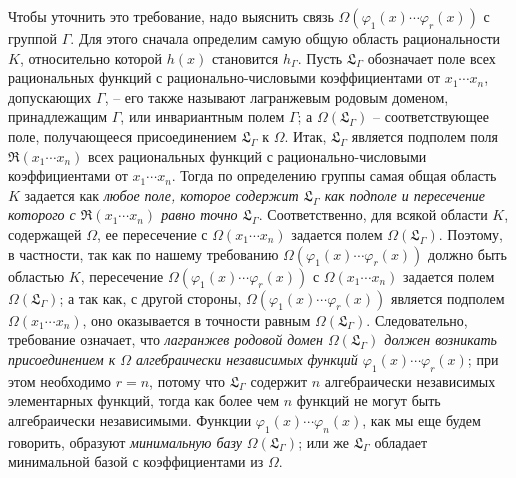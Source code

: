 \documentclass[11pt]{article}
\begin{document}
Чтобы уточнить это требование, надо выяснить связь $\Omega(\varphi_1(x)\cdots\varphi_r(x))$ с группой $\Gamma$. Для этого сначала определим самую общую область рациональности $K$, относительно которой $h(x)$ становится $h_\Gamma$. Пусть $\mathfrak L_\Gamma$ обозначает поле всех рациональных функций с рационально-числовыми коэффициентами от $x_1\cdots x_n$, допускающих $\Gamma$, -- его также называют лагранжевым родовым доменом, принадлежащим $\Gamma$, или инвариантным полем $\Gamma$; а $\Omega(\mathfrak L_\Gamma)$ -- соответствующее поле, получающееся присоединением $\mathfrak L_\Gamma$ к $\Omega$. Итак, $\mathfrak L_\Gamma$ является подполем поля $\mathfrak R(x_1\cdots x_n)$ всех рациональных функций с рационально-числовыми коэффициентами от $x_1\cdots x_n$. Тогда по определению группы самая общая область $K$ задается как \emph{любое поле, которое содержит $\mathfrak L_\Gamma$ как подполе и пересечение которого с $\mathfrak R(x_1\cdots x_n)$ равно точно $\mathfrak L_\Gamma$}. Соответственно, для всякой области $K$, содержащей $\Omega$, ее пересечение с $\Omega(x_1\cdots x_n)$ задается полем $\Omega(\mathfrak L_\Gamma)$. Поэтому, в частности, так как по нашему требованию $\Omega(\varphi_1(x)\cdots\varphi_r(x))$ должно быть областью $K$, пересечение $\Omega(\varphi_1(x)\cdots\varphi_r(x))$ с $\Omega(x_1\cdots x_n)$ задается полем $\Omega(\mathfrak L_\Gamma)$; а так как, с другой стороны, $\Omega(\varphi_1(x)\cdots\varphi_r(x))$ является подполем $\Omega(x_1\cdots x_n)$, оно оказывается в точности равным $\Omega(\mathfrak L_\Gamma)$. Следовательно, требование означает, что \emph{лагранжев родовой домен $\Omega(\mathfrak L_\Gamma)$ должен возникать присоединением к $\Omega$ алгебраически независимых функций $\varphi_1(x)\cdots\varphi_r(x)$}; при этом необходимо $r=n$, потому что $\mathfrak L_\Gamma$ содержит $n$ алгебраически независимых элементарных функций, тогда как более чем $n$ функций не могут быть алгебраически независимыми. Функции $\varphi_1(x)\cdots\varphi_n(x)$, как мы еще будем говорить, образуют \emph{минимальную базу} $\Omega(\mathfrak L_\Gamma)$; или же $\mathfrak L_\Gamma$ обладает минимальной базой с коэффициентами из $\Omega$.
\end{document}
